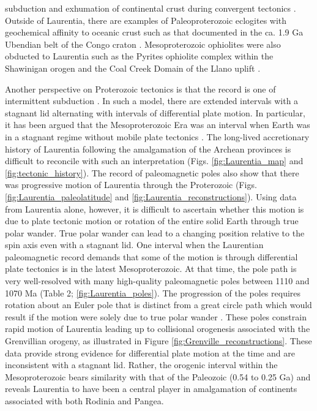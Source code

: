 \documentclass[twocolumn, switch]{article} %
\begin{document}
subduction and exhumation of continental crust during convergent tectonics \citep{Weller2017a}. Outside of Laurentia, there are examples of Paleoproterozoic eclogites with geochemical affinity to oceanic crust such as that documented in the ca. 1.9 Ga Ubendian belt of the Congo craton \citep{Boniface2012a}. Mesoproterozoic ophiolites were also obducted to Laurentia such as the Pyrites ophiolite complex within the Shawinigan orogen and the Coal Creek Domain of the Llano uplift \citep{Chiarenzelli2011a, McLelland2013a}.

Another perspective on Proterozoic tectonics is that the record is one of intermittent subduction \citep{Silver2008a, ONeill2013a}. In such a model, there are extended intervals with a stagnant lid alternating with intervals of differential plate motion. In particular, it has been argued that the Mesoproterozoic Era was an interval when Earth was in a stagnant regime without mobile plate tectonics \citep{Silver2008a, ONeill2013a}. The long-lived accretionary history of Laurentia following the amalgamation of the Archean provinces is difficult to reconcile with such an interpretation (Figs. \ref{fig:Laurentia_map} and \ref{fig:tectonic_history}). The record of paleomagnetic poles also show that there was progressive motion of Laurentia through the Proterozoic (Figs. \ref{fig:Laurentia_paleolatitude} and \ref{fig:Laurentia_reconstructions}). Using data from Laurentia alone, however, it is difficult to ascertain whether this motion is due to plate tectonic motion or rotation of the entire solid Earth through true polar wander. True polar wander can lead to a changing position relative to the spin axis even with a stagnant lid. One interval when the Laurentian paleomagnetic record demands that some of the motion is through differential plate tectonics is in the latest Mesoproterozoic. At that time, the pole path is very well-resolved with many high-quality paleomagnetic poles between 1110 and 1070 Ma (Table 2; \ref{fig:Laurentia_poles}). The progression of the poles requires rotation about an Euler pole that is distinct from a great circle path which would result if the motion were solely due to true polar wander \citep{Swanson-Hysell2019a}. These poles constrain rapid motion of Laurentia leading up to collisional orogenesis associated with the Grenvillian orogeny, as illustrated in Figure \ref{fig:Grenville_reconstructions}. These data provide strong evidence for differential plate motion at the time and are inconsistent with a stagnant lid. Rather, the orogenic interval within the Mesoproterozoic bears similarity with that of the Paleozoic (0.54 to 0.25 Ga) and reveals Laurentia to have been a central player in amalgamation of continents associated with both Rodinia and Pangea.
\end{document}
